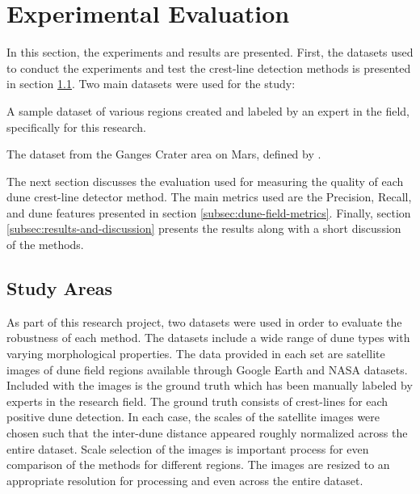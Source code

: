 \section{Experimental Evaluation} \label{sec:experimental_evaluation}

In this section, the experiments and results are presented. First, the datasets used to conduct the experiments and test the crest-line detection methods is presented in section \ref{subsec:study-areas}. Two main datasets were used for the study:

\begin{description}[align=left]
	\item[Terrestrial Dataset] A sample dataset of various regions created and labeled by an expert in the field, specifically for this research.
	\item[Mars Dataset] The dataset from the Ganges Crater area on Mars, defined by \cite{vaz_object_based_dune_analysis}.
\end{description}

The next section discusses the evaluation used for measuring the quality of each dune crest-line detector method. The main metrics used are the Precision, Recall, and dune features presented in section \ref{subsec:dune-field-metrics}. Finally, section \ref{subsec:results-and-discussion} presents the results along with a short discussion of the methods. 

\subsection{Study Areas} \label{subsec:study-areas}

As part of this research project, two datasets were used in order to evaluate the robustness of each method. The datasets include a wide range of dune types with varying morphological properties. The data provided in each set are satellite images of dune field regions available through Google Earth and NASA datasets. Included with the images is the ground truth which has been manually labeled by experts in the research field. The ground truth consists of crest-lines for each positive dune detection. In each case, the scales of the satellite images were chosen such that the inter-dune distance appeared roughly normalized across the entire dataset. Scale selection of the images is important process for even comparison of the methods for different regions. The images are resized to an appropriate resolution for processing and even across the entire dataset.

